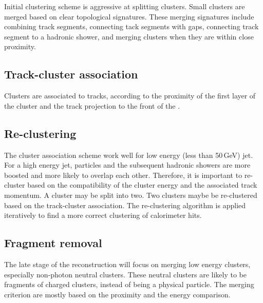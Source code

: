 Initial clustering scheme is aggressive at splitting clusters. Small clusters are merged  based on clear topological signatures. These merging signatures include combining track segments, connecting tack segments with gaps, connecting track segment to a hadronic shower, and merging clusters when they are within close proximity.

\subsection{Track-cluster association}

Clusters are associated to tracks, according to the proximity of the first layer of the cluster and the track projection to the front of the \ECAL. 


\subsection{Re-clustering}

The cluster association scheme work well for low energy (less than 50\,GeV) jet. For a high energy jet, particles and the subsequent hadronic showers are more boosted and more likely to overlap each other. Therefore, it is important to re-cluster based on the compatibility of the cluster energy and the associated track momentum. A cluster may be split into two. Two clusters maybe be re-clustered based on the track-cluster association. The re-clustering algorithm is applied iteratively to find a more correct clustering of calorimeter hits.

\subsection{Fragment removal}
\label{sec:pandoraFragmentRemoval}
The late stage of the reconstruction will focus on merging low energy clusters, especially non-photon neutral clusters. These neutral clusters are likely to be fragments of charged clusters, instead of being a physical particle. The merging criterion are mostly based on the proximity and the energy comparison.

